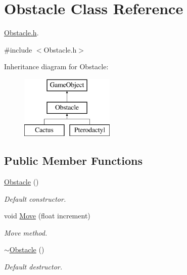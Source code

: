\hypertarget{class_obstacle}{}\section{Obstacle Class Reference}
\label{class_obstacle}


\mbox{\hyperlink{_obstacle_8h_source}{Obstacle.\+h}}.  




{\ttfamily \#include $<$Obstacle.\+h$>$}

Inheritance diagram for Obstacle\+:\begin{figure}[H]
\begin{center}
\leavevmode
\includegraphics[height=3.000000cm]{class_obstacle}
\end{center}
\end{figure}
\subsection*{Public Member Functions}
\begin{DoxyCompactItemize}
\item 
\mbox{\hyperlink{class_obstacle_a8f734072321fa06a7b7dae2d5f50f352}{Obstacle}} ()
\begin{DoxyCompactList}\small\item\em Default constructor. \end{DoxyCompactList}\item 
void \mbox{\hyperlink{class_obstacle_af06377faeba537b4ff98ee2cfa061831}{Move}} (float increment)
\begin{DoxyCompactList}\small\item\em Move method. \end{DoxyCompactList}\item 
\mbox{\label{class_obstacle_af2f9cc9c6cff75dca0974fd5ac4f71a9}} 
\mbox{\hyperlink{class_obstacle_af2f9cc9c6cff75dca0974fd5ac4f71a9}{$\sim$\+Obstacle}} ()
\begin{DoxyCompactList}\small\item\em Default destructor. \end{DoxyCompactList}\end{DoxyCompactItemize}
